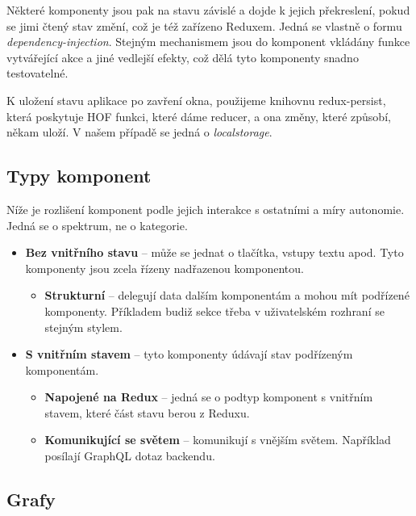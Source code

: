 Některé komponenty jsou pak na stavu závislé a dojde k jejich překreslení, pokud se jimi čtený stav změní, což je též zařízeno
Reduxem. Jedná se vlastně o formu \textit{dependency-injection}. Stejným mechanismem jsou do komponent vkládány
funkce vytvářející akce a jiné vedlejší efekty, což dělá tyto komponenty snadno testovatelné.

K uložení stavu aplikace po zavření okna, použijeme knihovnu redux-persist, která poskytuje
HOF funkci, které dáme reducer, a ona změny, které způsobí, někam uloží. \citep[viz][]{reduxpersist}
V našem případě se jedná o \textit{localstorage}.

\subsection{Typy komponent}

\noindent
Níže je rozlišení komponent podle jejich interakce s ostatními a míry autonomie.
Jedná se o spektrum, ne o kategorie.

\begin{itemize}
  \setlength\itemsep{0.05em}
  \item \textbf{Bez vnitřního stavu} -- může se jednat o tlačítka, vstupy textu apod. Tyto komponenty jsou zcela řízeny
      nadřazenou komponentou.
  \begin{itemize}
    \setlength\itemsep{0.05em}
    \item \textbf{Strukturní} -- delegují data dalším komponentám a mohou mít podřízené komponenty. Příkladem budiž sekce třeba v 
        uživatelském rozhraní se stejným stylem.
  \end{itemize}
  \item \textbf{S vnitřním stavem} -- tyto komponenty údávají stav podřízeným komponentám.
  \begin{itemize}
    \setlength\itemsep{0.05em}
    \item \textbf{Napojené na Redux} -- jedná se o podtyp komponent s vnitřním stavem, které část stavu berou z Reduxu.
    \item \textbf{Komunikující se světem} --  komunikují s vnějším světem. Například posílají GraphQL dotaz backendu.
  \end{itemize}
\end{itemize}

\subsection{Grafy}

